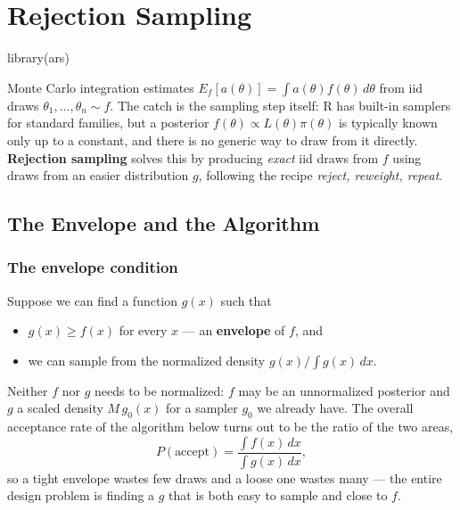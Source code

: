\documentclass[
  letterpaper,
  DIV=11,
  numbers=noendperiod]{scrreprt}
\newenvironment{Shaded}{\begin{snugshade}}{\end{snugshade}}
\newcommand{\FunctionTok}[1]{\textcolor[rgb]{0.28,0.35,0.67}{#1}}
\newcommand{\NormalTok}[1]{\textcolor[rgb]{0.00,0.23,0.31}{#1}}
\providecommand{\tightlist}{%
  \setlength{\itemsep}{0pt}\setlength{\parskip}{0pt}}
\begin{document}

\chapter{Rejection Sampling}\label{rejection-sampling}

\begin{Shaded}
\begin{Highlighting}[]
\FunctionTok{library}\NormalTok{(ars)}
\end{Highlighting}
\end{Shaded}

Monte Carlo integration estimates
\(E_f[a(\theta)] = \int a(\theta) f(\theta)\,d\theta\) from iid draws
\(\theta_1,\ldots,\theta_n \sim f\). The catch is the sampling step
itself: R has built-in samplers for standard families, but a posterior
\(f(\theta) \propto L(\theta)\pi(\theta)\) is typically known only up to
a constant, and there is no generic way to draw from it directly.
\textbf{Rejection sampling} solves this by producing \emph{exact} iid
draws from \(f\) using draws from an easier distribution \(g\),
following the recipe \emph{reject, reweight, repeat}.

\section{The Envelope and the
Algorithm}\label{the-envelope-and-the-algorithm}

\subsection{The envelope condition}\label{the-envelope-condition}

Suppose we can find a function \(g(x)\) such that

\begin{itemize}
\tightlist
\item
  \(g(x) \ge f(x)\) for every \(x\) --- an \textbf{envelope} of \(f\),
  and
\item
  we can sample from the normalized density \(g(x)/\!\int g(x)\,dx\).
\end{itemize}

Neither \(f\) nor \(g\) needs to be normalized: \(f\) may be an
unnormalized posterior and \(g\) a scaled density \(M\,g_0(x)\) for a
sampler \(g_0\) we already have. The overall acceptance rate of the
algorithm below turns out to be the ratio of the two areas, \[
P(\text{accept}) = \frac{\int f(x)\,dx}{\int g(x)\,dx},
\] so a tight envelope wastes few draws and a loose one wastes many ---
the entire design problem is finding a \(g\) that is both easy to sample
and close to \(f\).
\end{document}
